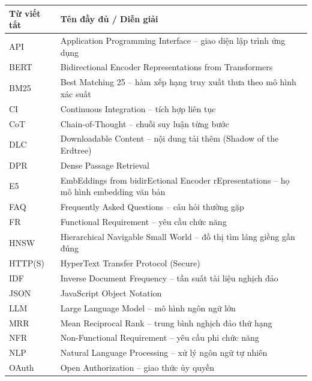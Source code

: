 
\begingroup
{}
\renewcommand{\arraystretch}{1.3}
\begin{longtable}{|p{3.0cm}|p{11.6cm}|}
    \hline
    \centering\arraybackslash\textbf{Từ viết tắt} & \centering\arraybackslash\textbf{Tên đầy đủ / Diễn giải} \\
    \hline
    \endhead
        API & Application Programming Interface -- giao diện lập trình ứng dụng \\ \hline
        BERT & Bidirectional Encoder Representations from Transformers \\ \hline
        BM25 & Best Matching 25 -- hàm xếp hạng truy xuất thưa theo mô hình xác suất \\ \hline
        CI & Continuous Integration -- tích hợp liên tục \\ \hline
        CoT & Chain-of-Thought -- chuỗi suy luận từng bước \\ \hline
        DLC & Downloadable Content -- nội dung tải thêm (Shadow of the Erdtree) \\ \hline
        DPR & Dense Passage Retrieval \\ \hline
        E5 & EmbEddings from bidirEctional Encoder rEpresentations -- họ mô hình embedding văn bản \\ \hline
        FAQ & Frequently Asked Questions -- câu hỏi thường gặp \\ \hline
        FR & Functional Requirement -- yêu cầu chức năng \\ \hline
        HNSW & Hierarchical Navigable Small World -- đồ thị tìm láng giềng gần đúng \\ \hline
        HTTP(S) & HyperText Transfer Protocol (Secure) \\ \hline
        IDF & Inverse Document Frequency -- tần suất tài liệu nghịch đảo \\ \hline
        JSON & JavaScript Object Notation \\ \hline
        LLM & Large Language Model -- mô hình ngôn ngữ lớn \\ \hline
        MRR & Mean Reciprocal Rank -- trung bình nghịch đảo thứ hạng \\ \hline
        NFR & Non-Functional Requirement -- yêu cầu phi chức năng \\ \hline
        NLP & Natural Language Processing -- xử lý ngôn ngữ tự nhiên \\ \hline
        OAuth & Open Authorization -- giao thức ủy quyền \\ \hline

\end{longtable}
